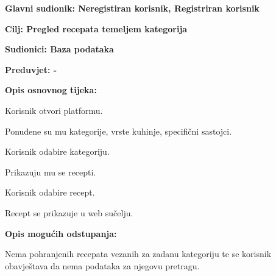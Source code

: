 				
						\noindent {}
					\begin{packed_item}
						
						\item \textbf{Glavni sudionik: Neregistiran korisnik, Registriran korisnik}
						\item  \textbf{Cilj: Pregled recepata temeljem kategorija} 
						\item  \textbf{Sudionici: Baza podataka} 
						\item  \textbf{Preduvjet: -} 
						\item  \textbf{Opis osnovnog tijeka:}
						
						\item[] \begin{packed_enum}
							
							\item Korisnik otvori platformu.
							\item Ponuđene su mu kategorije, vrste kuhinje, specifični sastojci.
							\item Korisnik odabire kategoriju.
							\item Prikazuju mu se recepti.
							\item Korisnik odabire recept.
							\item Recept se prikazuje u web sučelju.
						\end{packed_enum}
						
						\item  \textbf{Opis mogućih odstupanja:}
						
						\item[] \begin{packed_item}
							
							\item[3.a] Nema pohranjenih recepata vezanih za zadanu kategoriju te se korisnik obavještava da nema podataka za njegovu pretragu.
							
							
						\end{packed_item}
					\end{packed_item}
					
